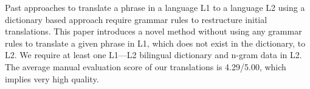 Past approaches to translate a phrase in a language L1 to a language L2 using a dictionary based approach require grammar rules to restructure initial translations. This paper introduces a novel method without using any grammar rules to translate a given phrase in L1, which does not exist in the dictionary, to L2. We require at least one L1---L2 bilingual dictionary and n-gram data in L2. The average manual evaluation score of our translations is 4.29/5.00, which implies very high quality.
